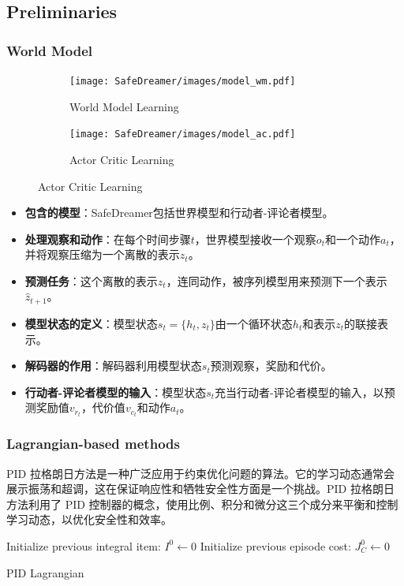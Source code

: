 \documentclass[10pt,mathserif]{beamer}%
\begin{document}
\subsection{Preliminaries}
\begin{frame}[t, fragile]
  \frametitle{World Model}
   \begin{figure}
\begin{subfigure}{.5\textwidth}
\texttt{[image: SafeDreamer/images/model\_wm.pdf]}
\caption{World Model Learning}
\end{subfigure}
\begin{subfigure}{.43\textwidth}
\texttt{[image: SafeDreamer/images/model\_ac.pdf]}
\caption{Actor Critic Learning}
\end{subfigure}
\label{fig:model}
\end{figure}
{
\fontsize{8pt}{9.6pt}\selectfont
\begin{itemize}
\item \textbf{包含的模型}：SafeDreamer包括世界模型和行动者-评论者模型。
\item \textbf{处理观察和动作}：在每个时间步骤$t$，世界模型接收一个观察$o_t$和一个动作$a_t$，并将观察压缩为一个离散的表示$z_t$。
\item \textbf{预测任务}：这个离散的表示$z_t$，连同动作，被序列模型用来预测下一个表示$\hat{z}_{t+1}$。
\item \textbf{模型状态的定义}：模型状态$s_t=\{h_t, z_t\}$由一个循环状态$h_t$和表示$z_t$的联接表示。
\item \textbf{解码器的作用}：解码器利用模型状态$s_t$预测观察，奖励和代价。
\item \textbf{行动者-评论者模型的输入}：模型状态$s_t$充当行动者-评论者模型的输入，以预测奖励值$v_{r_t}$，代价值$v_{c_t}$和动作$a_t$。
\end{itemize}
}
\end{frame}

\begin{frame}[fragile]
	\frametitle{Lagrangian-based methods}
	PID 拉格朗日方法是一种广泛应用于约束优化问题的算法。它的学习动态通常会展示振荡和超调，这在保证响应性和牺牲安全性方面是一个挑战。PID 拉格朗日方法利用了 PID 控制器的概念，使用比例、积分和微分这三个成分来平衡和控制学习动态，以优化安全性和效率。
	\begin{algorithm}[H]
		\SetAlgoLined
		
		Initialize previous integral item: $I^0 \leftarrow 0$\;
		Initialize previous episode cost: $J_C^0 \leftarrow 0$\;
		\caption{PID Lagrangian}
		\label{alg: pid_lag}
		\end{algorithm}
\end{frame}
\end{document}

